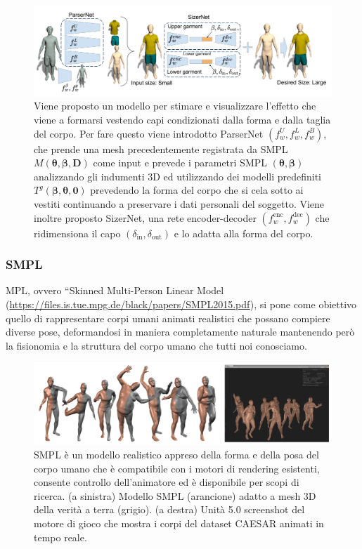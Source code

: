 \begin{figure}[ht!]
  \centering
  \includegraphics[scale=0.45]{Images/IntroductionPic/Sizer.png}
  \caption{Viene proposto un modello per stimare e visualizzare l'effetto che viene a formarsi vestendo capi condizionati dalla forma e dalla taglia del corpo. Per fare questo viene introdotto ParserNet $(f_{w}^{U}, f_{w}^{L}, f_{w}^{B})$, che prende una mesh precedentemente registrata da SMPL $M(\boldsymbol{\theta}, \boldsymbol{\beta}, \mathbf{D})$ come input e prevede i parametri SMPL $(\boldsymbol{\theta}, \boldsymbol{\beta})$ analizzando gli indumenti 3D ed utilizzando dei modelli predefiniti $T^{g}(\boldsymbol{\beta}, \boldsymbol{\theta}, \mathbf{0})$ prevedendo la forma del corpo che si cela sotto ai vestiti continuando a preservare i dati personali del soggetto. Viene inoltre proposto SizerNet, una rete encoder-decoder $\left(f_{w}^{\mathrm{enc}}, f_{w}^{\mathrm{dec}}\right)$ che ridimensiona il capo $\left(\delta_{\mathrm{in}}, \delta_{\mathrm{out}}\right)$ e lo adatta alla forma del corpo.  }
    \label{fig:Sizer}
\end{figure}

\newpage

\subsubsection{SMPL}
  
MPL, ovvero “Skinned Multi-Person Linear Model (\url{https://files.is.tue.mpg.de/black/papers/SMPL2015.pdf}), si pone come obiettivo quello di rappresentare corpi umani animati realistici che possano compiere diverse pose, deformandosi in maniera completamente naturale mantenendo però la fisionomia e la struttura del corpo umano che tutti noi conosciamo.

  \begin{figure}[ht!]
  \centering
  \includegraphics[scale=0.4]{Images/IntroductionPic/SMPL.png}
  \caption{SMPL è un modello realistico appreso della forma e della posa del corpo umano che è compatibile con i motori di rendering esistenti, consente
controllo dell'animatore ed è disponibile per scopi di ricerca. (a sinistra) Modello SMPL (arancione) adatto a mesh 3D della verità a terra (grigio). (a destra) Unità 5.0
screenshot del motore di gioco che mostra i corpi del dataset CAESAR animati in tempo reale.}
  \label{fig:SMPL}
\end{figure}

